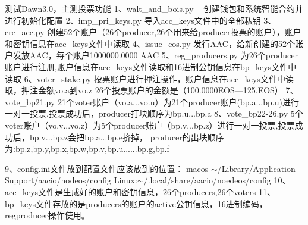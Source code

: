 测试\+Dawn3.0，主测投票功能 1、walt\+\_\+and\+\_\+bois.py ~\newline
创建钱包和系统智能合约并进行初始化配置 2、imp\+\_\+pri\+\_\+keys.py 导入acc\+\_\+keys文件中的全部私钥 3、cre\+\_\+acc.py 创建52个账户（26个producer,26个用来给producer投票的账户），账户和密钥信息在acc\+\_\+keys文件中读取 4、issue\+\_\+eos.py 发行\+A\+A\+C，给新创建的52个账户发放\+A\+A\+C，每个账户1000000.0000 A\+AC 5、reg\+\_\+producers.py 为26个producer账户进行注册,账户信息在acc\+\_\+keys文件读取和16进制公钥信息在bp\+\_\+keys文件中读取 6、voter\+\_\+stake.py 投票账户进行押注操作，账户信息在acc\+\_\+keys文件中读取，押注金额vo.\+a到vo.\+z 26个投票账户的金额是（100.0000\+E\+OS---125.\+E\+OS） 7、vote\+\_\+bp21.py 21个voter账户（vo.a...vo.\+u）为21个producer账户(bp.\+a...bp.\+u)进行一对一投票,投票成功后，producer打块顺序为bp.\+u...bp.\+a 8、vote\+\_\+bp22-\/26.py 5个voter账户（vo.v...vo.\+z）为5个producer账户（bp.\+v...bp.\+z）进行一对一投票,投票成功后，bp.\+v...bp.\+z会把bp.\+a...bp.\+e挤掉， producer的出块顺序为\+:bp.\+z,bp.\+y,bp.\+x,bp.\+w,bp.\+v,bp.\+u......bp.\+g,bp.\+f

9、config.ini文件放到配置文件应该放到的位置： macos $\sim$/\+Library/\+Application Support/aacio/nodeos/config Linux\+:$\sim$/.local/share/aacio/noedeos/config 10、acc\+\_\+keys文件是生成好的账户和密钥信息，26个producers,26个voters 11、bp\+\_\+keys文件存放的是producers的账户的active公钥信息，16进制编码，regproducer操作使用。 